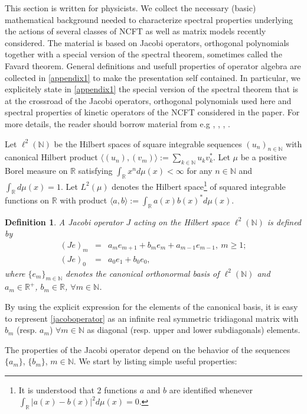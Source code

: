 \documentclass[a4paper,11pt,twoside]{article}
\numberwithin{equation}{section}
\newtheorem{definition}[Theorem]{Definition}
\theoremstyle{nonumberplain}
\begin{document}
This section is written for physicists. We collect the necessary (basic) mathematical background needed to characterize spectral properties underlying the actions of several classes of NCFT as well as matrix models recently considered. The material is based on Jacobi operators, orthogonal polynomials together with a special version of the spectral theorem, sometimes called the Favard theorem. General definitions and usefull properties of operator algebra are collected in \ref{appendix1} to make the presentation self contained. In particular, we explicitely state in \ref{appendix1} the special version of the spectral theorem that is at the crossroad of the Jacobi operators, orthogonal polynomials used here and spectral properties of kinetic operators of the NCFT considered in the paper. For more details, the reader should borrow material from e.g \cite{akhiez:1965}, \cite{Gszego}, \cite{bsimon}, \cite{teschl}.\par
Let $\ell^2(\mathbb{N})$ be the Hilbert spaces of square integrable sequences $(u_n)_{n\in\mathbb{N}}$ with canonical Hilbert product $\langle (u_n),(v_m)\rangle:=\sum_{k\in\mathbb{N}}u_kv_k^*$. Let $\mu$ be a positive Borel measure on $\mathbb{R}$ satisfying $\int_\mathbb{R} x^nd\mu(x)<\infty$ for any $n\in\mathbb{N}$ and $\int_\mathbb{R} d\mu(x)=1$. Let $L^2(\mu)$ denotes the Hilbert space{\footnote{It is understood that 2 functions $a$ and $b$ are identified whenever $\int_\mathbb{R}\vert a(x)-b(x) \vert^2d\mu(x)=0$.}} of squared integrable functions on $\mathbb{R}$ with product $\langle a,b\rangle:=\int_\mathbb{R}a(x)b(x)^*d\mu(x)$. 
\begin{definition}\label{defin-jacobi}
A Jacobi operator $J$ acting on the Hilbert space $\ell^2(\mathbb{N})$ is defined by
\begin{eqnarray}
(Je)_m&=&a_me_{m+1}+b_me_m+a_{m-1}e_{m-1},\ m\ge1;\nonumber\\ 
(Je)_0&=&a_0e_1+b_0e_0 \label{jacoboperator},
\end{eqnarray}
where $\{e_m\}_{m\in\mathbb{N}}$ denotes the canonical orthonormal basis of $\ell^2(\mathbb{N})$ and $a_m\in\mathbb{R}^+$, $b_m\in\mathbb{R}$, $\forall m\in\mathbb{N}$.
\end{definition}
By using the explicit expression for the elements of the canonical basis, it is easy to represent \eqref{jacoboperator} as an infinite real symmetric tridiagonal matrix with $b_m$ (resp. $a_m$) $\forall m\in\mathbb{N}$ as diagonal (resp. upper and lower subdiagonals) elements. \par 
The properties of the Jacobi operator depend on the behavior of the sequences $\{a_m\}$, $\{b_m\}$, $m\in\mathbb{N}$. We start by listing simple useful properties:
\end{document}
